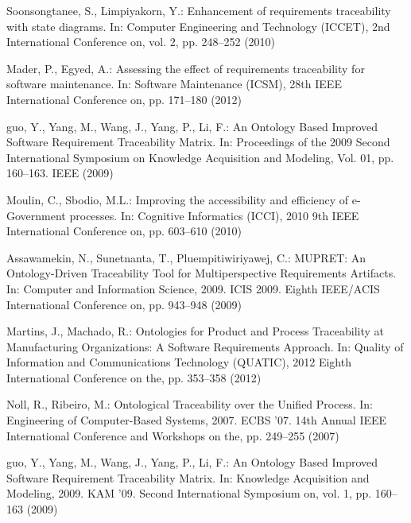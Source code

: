 \documentclass[runningheads,a4paper]{llncs}
\begin{document}
\begin{thebibliography}{4}
 Soonsongtanee, S., Limpiyakorn, Y.: Enhancement of requirements traceability
with state diagrams. In: Computer Engineering and Technology (ICCET), 2nd International Conference on, vol. 2, pp. 248--252 (2010)

 Mader, P., Egyed, A.: Assessing the effect of requirements traceability for software
maintenance. In: Software Maintenance (ICSM), 28th IEEE International Conference on, pp. 171--180 (2012)

 guo, Y., Yang, M., Wang, J., Yang, P., Li, F.: An Ontology
Based Improved Software Requirement Traceability Matrix. In: Proceedings of the
2009 Second International Symposium on Knowledge Acquisition and Modeling,
Vol. 01, pp. 160--163. IEEE (2009)

 Moulin, C., Sbodio, M.L.: Improving the accessibility and
efficiency of e-Government processes. In: Cognitive Informatics (ICCI), 2010 9th
IEEE International Conference on, pp. 603--610 (2010)

 Assawamekin, N., Sunetnanta, T., Pluempitiwiriyawej, C.: MUPRET: An
Ontology-Driven Traceability Tool for Multiperspective Requirements Artifacts.
In: Computer and Information Science, 2009. ICIS 2009. Eighth IEEE/ACIS
International Conference on, pp. 943--948 (2009)

 Martins, J., Machado, R.: Ontologies for Product and Process
Traceability at Manufacturing Organizations: A Software Requirements Approach.
In: Quality of Information and Communications Technology (QUATIC), 2012 Eighth
International Conference on the, pp. 353--358 (2012)

 Noll, R., Ribeiro, M.: Ontological Traceability over
the Unified Process. In: Engineering of Computer-Based Systems, 2007. ECBS '07.
14th Annual IEEE International Conference and Workshops on the, pp.
249--255 (2007)

 guo, Y., Yang, M., Wang, J., Yang, P., Li, F.: An Ontology Based Improved
Software Requirement Traceability Matrix. In: Knowledge Acquisition and
Modeling, 2009. KAM '09. Second International Symposium on, vol. 1, pp.
160--163 (2009)


\end{thebibliography}
\end{document}
